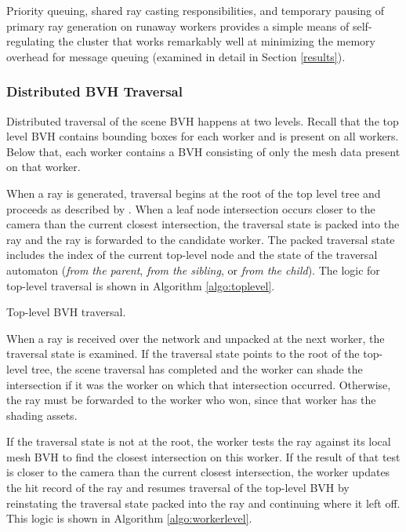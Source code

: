\documentclass[a4paper,twoside]{article}
\begin{document}
Priority queuing, shared ray casting responsibilities, and temporary pausing
of primary ray generation on runaway workers provides a simple means of
self-regulating the cluster that works remarkably well at minimizing the memory
overhead for message queuing (examined in detail in Section
\ref{results}).

\subsubsection{Distributed BVH Traversal}
\label{traversal}

Distributed traversal of the scene BVH happens at two levels. Recall that the
top level BVH contains bounding boxes for each worker and is present on all
workers. Below that, each worker contains a BVH consisting of only the mesh data
present on that worker.

When a ray is generated, traversal begins at the root of the top level tree
and proceeds as described by \cite{hapala:2011}. When a leaf node
intersection occurs closer to the camera than the current closest intersection,
the traversal state is packed into the ray and the ray is forwarded to the
candidate worker. The packed traversal state includes the index of the current
top-level node and the state of the traversal automaton (\emph{from the parent},
\emph{from the sibling}, or \emph{from the child}). The logic for top-level
traversal is shown in Algorithm \ref{algo:toplevel}.

\begin{algorithm}[h!]
    \SetAlgoLined


    \caption{Top-level BVH traversal.}
    \label{algo:toplevel}
\end{algorithm}

When a ray is received over the network and unpacked at the next worker, the traversal
state is examined. If the traversal state points to the root of the top-level
tree, the scene traversal has completed and the worker can shade the
intersection if it was the worker on which that intersection occurred.
Otherwise, the ray must be forwarded to the worker who won, since that worker has
the shading assets.

If the traversal state is not at the root, the worker tests the ray against its local
mesh BVH to find the closest intersection on this worker. If the result of that
test is closer to the camera than the current closest intersection, the worker updates
the hit record of the ray and resumes traversal of the top-level BVH by
reinstating the traversal state packed into the ray and continuing where it left
off. This logic is shown in Algorithm \ref{algo:workerlevel}.
\end{document}

